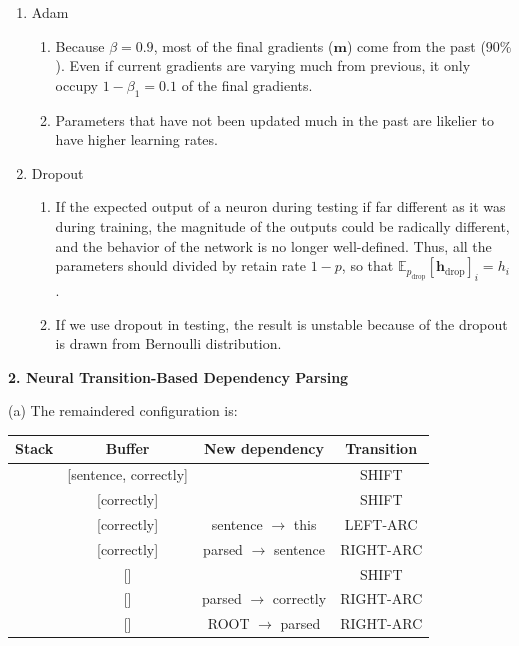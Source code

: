 \begin{enumerate}[label=(\alph*)]
	\item Adam
	\begin{enumerate}[label=(\roman*)]
		\item Because $\beta = 0.9$, most of the final gradients ($\bm{m}$) come from the past ($90\%$). Even if current gradients are varying much from previous, it only occupy $1 - \beta_1 = 0.1$ of the final gradients.
		\item Parameters that have not been updated much in the past are likelier to have higher learning rates.
	\end{enumerate}
	\item Dropout
	\begin{enumerate}[label=(\roman*)]
		\item If the expected output of a neuron during testing if far different as it was during training, the magnitude of the outputs could be radically different, and the behavior of the network is no longer well-defined. Thus, all the parameters should divided by retain rate $1-p$, so that $\mathbb{E}_{p_{\text{drop}}} [\bm{h}_{\text{drop}}]_i = h_i$.
		\item If we use dropout in testing, the result is unstable because of the dropout is drawn from Bernoulli distribution.
	\end{enumerate}
\end{enumerate}

\textbf{2. Neural Transition-Based Dependency Parsing}

(a) The remaindered configuration is:
\begin{table}
	\begin{center}
		\begin{tabular}{c|c|c|c}
			Stack & Buffer & New dependency & Transition \\
			\hline
			[ROOT, parsed, this] & [sentence, correctly] & & \textsf{SHIFT} \\ \hline
			[ROOT, parsed, this, sentence] & [correctly] & & \textsf{SHIFT} \\ \hline
			[ROOT, parsed, sentence] & [correctly] & sentence $\rightarrow$ this & \textsf{LEFT-ARC} \\ \hline
			[ROOT, parsed] & [correctly] & parsed $\rightarrow$ sentence & \textsf{RIGHT-ARC} \\ \hline
			[ROOT, parsed, correctly] & [] & & \textsf{SHIFT} \\ \hline
			[ROOT, parsed] & [] & parsed $\rightarrow$ correctly & \textsf{RIGHT-ARC} \\ \hline
			[ROOT] & [] & ROOT $\rightarrow$ parsed & \textsf{RIGHT-ARC}
		\end{tabular}
	\end{center}
\end{table}

